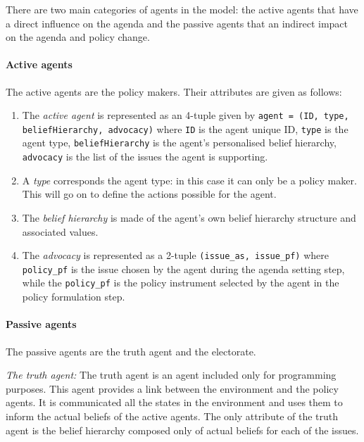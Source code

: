 \documentclass[11pt]{article}
\begin{document}
There are two main categories of agents in the model: the active agents that have a direct influence on the agenda and the passive agents that an indirect impact on the agenda and policy change.

\paragraph{Active agents}

The active agents are the policy makers. Their attributes are given as follows:

\begin{enumerate}

\item The \emph{active agent} is represented as an 4-tuple given by \texttt{agent = (ID, type, beliefHierarchy, advocacy)} where
\texttt{ID} is the agent unique ID,
\texttt{type} is the agent type, 
\texttt{beliefHierarchy} is the agent's personalised belief hierarchy, 
\texttt{advocacy} is the list of the issues the agent is supporting.

\item A \emph{type} corresponds the agent type: in this case it can only be a policy maker. This will go on to define the actions possible for the agent.

\item The \emph{belief hierarchy} is made of the agent's own belief hierarchy structure and associated values.

\item The \emph{advocacy} is represented as a 2-tuple \texttt{(issue\_as, issue\_pf)} where \texttt{policy\_pf} is the issue chosen by the agent during the agenda setting step, while the \texttt{policy\_pf} is the policy instrument selected by the agent in the policy formulation step.

\end{enumerate}


\paragraph{Passive agents}

The passive agents are the truth agent and the electorate.

\emph{The truth agent:} The truth agent is an agent included only for programming purposes. This agent provides a link between the environment and the policy agents. It is communicated all the states in the environment and uses them to inform the actual beliefs of the active agents. The only attribute of the truth agent is the belief hierarchy composed only of actual beliefs for each of the issues.
\end{document}
